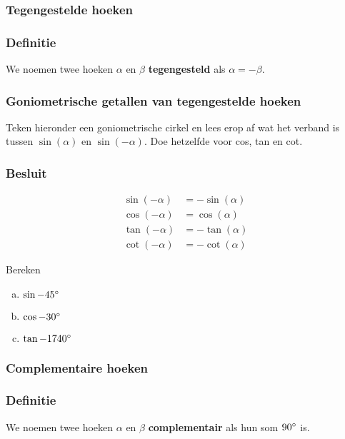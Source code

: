 \documentclass[twoside,a4paper,12pt]{article}
\begin{document}
\needspace{5cm}
\subsubsection{Tegengestelde hoeken}
\subsubsection*{Definitie}
We noemen twee hoeken $\alpha$ en $\beta$ \textbf{tegengesteld} als $\alpha=-\beta$.
\subsubsection*{Goniometrische getallen van tegengestelde hoeken}
Teken hieronder een goniometrische cirkel en lees erop af wat het verband is tussen $\sin(\alpha)$ en $\sin(-\alpha)$. Doe hetzelfde voor cos, tan en cot.
\vspace*{7cm}
\subsubsection*{Besluit}
\begin{align*}
  \sin(-\alpha)&=-\sin(\alpha)\\
  \cos(-\alpha)&=\cos(\alpha)\\
  \tan(-\alpha)&=-\tan(\alpha)\\
  \cot(-\alpha)&=-\cot(\alpha)
\end{align*}

\begin{oefening}
Bereken
\begin{enumerate}[(a)]
  \itemsep0.5em
  \item $\sin-45^\circ$
  \item $\cos-30^\circ$
  \item $\tan-1740^\circ$
\end{enumerate}
\end{oefening}

\needspace{5cm}
\subsubsection{Complementaire hoeken}

\subsubsection*{Definitie}
We noemen twee hoeken $\alpha$ en $\beta$ \textbf{complementair} als hun som $90^\circ$ is.
\end{document}
